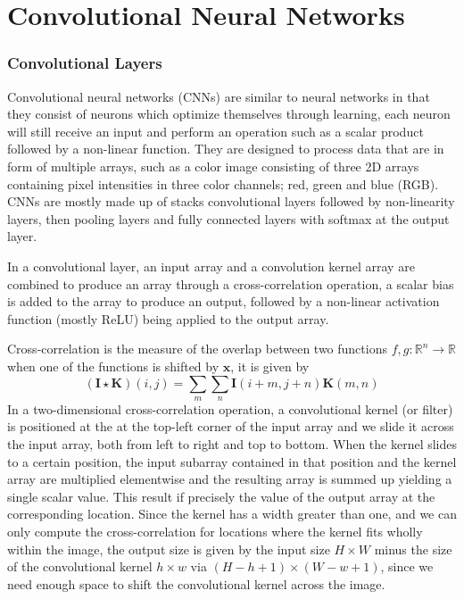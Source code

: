 \documentclass{beamer}
\begin{document}
\section{Convolutional Neural Networks}
\begin{frame}[allowframebreaks]
\frametitle{Convolutional Layers}
Convolutional neural networks (CNNs) are similar to neural networks in that they consist of neurons which optimize themselves through learning, each neuron will still receive an input and perform an operation such as a scalar product followed by a non-linear function. They are designed to process data that are in form of multiple arrays, such as a color image consisting of three 2D arrays containing pixel intensities in three color channels; red, green and blue (RGB). CNNs are mostly made up of stacks convolutional layers followed by non-linearity layers, then pooling layers and fully connected layers with softmax at the output layer.

In a convolutional layer, an input array and a convolution kernel array are combined to produce an array through a cross-correlation operation, a scalar bias is added to the array to produce an output, followed by a non-linear activation function (mostly ReLU) being applied to the output array. 

Cross-correlation is the measure of the overlap between two functions $f,g:\mathbb{R}^n
 \rightarrow \mathbb{R}$ when one of the functions is shifted by $\bm{x}$, it is given by
\begin{equation}\label{eqn:2d_cross}
(\bm{I} \star \bm{K}) (i,j) = \sum_m \sum_n \bm{I}(i+m,j+n) \bm{K}(m,n)
\end{equation} 
In a two-dimensional cross-correlation operation, a convolutional kernel (or filter) is positioned at the at the top-left corner of the input array and we slide it across the input array, both from left to right and top to bottom. When the kernel slides to a certain position, the input subarray contained in that position and the kernel array are multiplied elementwise and the resulting array is summed up yielding a single scalar value. This result if precisely the value of the output array at the corresponding location. Since the kernel has a width greater than one, and we can only compute the cross-correlation for locations where the kernel fits wholly within the image, the output size is given by the input size $H \times W$ minus the size of the convolutional kernel $h \times w$ via $(H - h + 1) \times (W - w + 1)$, since we need enough space to shift the convolutional kernel across the image.


\end{frame}
\end{document}
